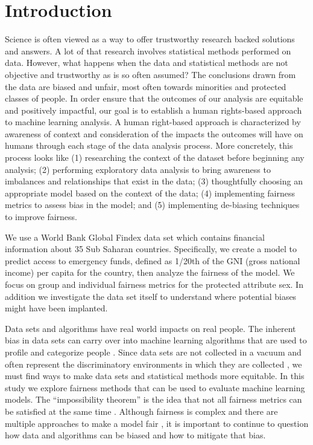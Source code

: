 \documentclass[water,article,submit,moreauthors,pdftex]{mdpi}
\begin{document}

\hypertarget{introduction}{%
\section{Introduction}\label{introduction}}

Science is often viewed as a way to offer trustworthy research backed
solutions and answers. A lot of that research involves statistical
methods performed on data. However, what happens when the data and
statistical methods are not objective and trustworthy as is so often
assumed? The conclusions drawn from the data are biased and unfair, most
often towards minorities and protected classes of people. In order
ensure that the outcomes of our analysis are equitable and positively
impactful, our goal is to establish a human rights-based approach to
machine learning analysis. A human right-based approach is characterized
by awareness of context and consideration of the impacts the outcomes
will have on humans through each stage of the data analysis process.
More concretely, this process looks like (1) researching the context of
the dataset before beginning any analysis; (2) performing exploratory
data analysis to bring awareness to imbalances and relationships that
exist in the data; (3) thoughtfully choosing an appropriate model based
on the context of the data; (4) implementing fairness metrics to assess
bias in the model; and (5) implementing de-biasing techniques to improve
fairness.

We use a World Bank Global Findex data set which contains financial
information about 35 Sub Saharan countries. Specifically, we create a
model to predict access to emergency funds, defined as 1/20th of the GNI
(gross national income) per capita for the country, then analyze the
fairness of the model. We focus on group and individual fairness metrics
for the protected attribute sex. In addition we investigate the data set
itself to understand where potential biases might have been implanted.

Data sets and algorithms have real world impacts on real people. The
inherent bias in data sets can carry over into machine learning
algorithms that are used to profile and categorize people
\citep{navarro2021risk, hellstrom2020bias}. Since data sets are not
collected in a vacuum and often represent the discriminatory
environments in which they are collected
\citep{barocas_fairness_nodate}, we must find ways to make data sets and
statistical methods more equitable. In this study we explore fairness
methods that can be used to evaluate machine learning models. The
``impossibility theorem'' is the idea that not all fairness metrics can
be satisfied at the same time \citep{kleinberg2016inherent}. Although
fairness is complex and there are multiple approaches to make a model
fair \citep{kypraiou_what_2021, green2018myth}, it is important to
continue to question how data and algorithms can be biased and how to
mitigate that bias.
\end{document}
